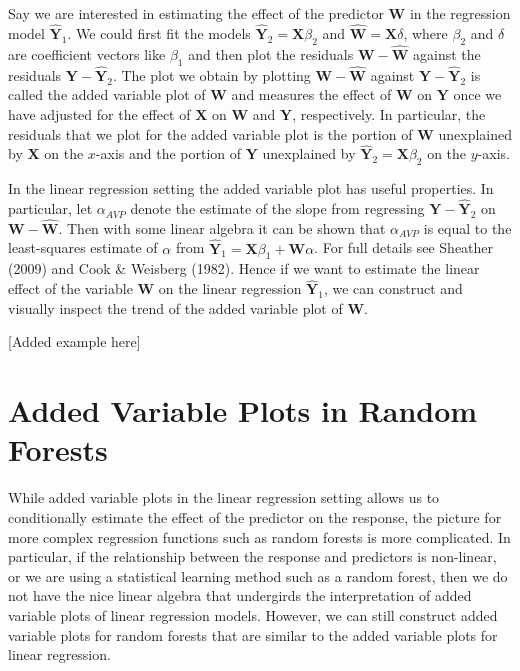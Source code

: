 \documentclass[12pt,twoside]{reedthesis}
\theoremstyle{definition}
\theoremstyle{definition}
\theoremstyle{definition}
\theoremstyle{remark}
\begin{document}
Say we are interested in estimating the effect of the predictor
\(\mathbf{W}\) in the regression model \(\hat{\mathbf{Y}}_1\). We could
first fit the models \(\hat{\mathbf{Y}}_2=\mathbf{X}\beta_2\) and
\(\hat{\mathbf{W}}=\mathbf{X}\delta\), where \(\beta_2\) and \(\delta\)
are coefficient vectors like \(\beta_1\) and then plot the residuals
\(\mathbf{W}-\hat{\mathbf{W}}\) against the residuals
\(\mathbf{Y}-\hat{\mathbf{Y}}_2\). The plot we obtain by plotting
\(\mathbf{W}-\hat{\mathbf{W}}\) against
\(\mathbf{Y}-\hat{\mathbf{Y}}_2\) is called the added variable plot of
\(\mathbf{W}\) and measures the effect of \(\mathbf{W}\) on
\(\mathbf{Y}\) once we have adjusted for the effect of \(\mathbf{X}\) on
\(\mathbf{W}\) and \(\mathbf{Y}\), respectively. In particular, the
residuals that we plot for the added variable plot is the portion of
\(\mathbf{W}\) unexplained by \(\mathbf{X}\) on the \(x\)-axis and the
portion of \(\mathbf{Y}\) unexplained by
\(\hat{\mathbf{Y}}_2=\mathbf{X}\beta_2\) on the \(y\)-axis. \par

In the linear regression setting the added variable plot has useful
properties. In particular, let \(\alpha_{AVP}\) denote the estimate of
the slope from regressing \(\mathbf{Y}-\hat{\mathbf{Y}}_2\) on
\(\mathbf{W}-\hat{\mathbf{W}}\). Then with some linear algebra it can be
shown that \(\alpha_{AVP}\) is equal to the least-squares estimate of
\(\alpha\) from
\(\hat{\mathbf{Y}}_1=\mathbf{X}\beta_1+\mathbf{W}\alpha\). For full
details see Sheather (2009) and Cook \& Weisberg (1982). Hence if we
want to estimate the linear effect of the variable \(\mathbf{W}\) on the
linear regression \(\hat{\mathbf{Y}}_1\), we can construct and visually
inspect the trend of the added variable plot of \(\mathbf{W}\). \par

{[}Added example here{]} \par

\section{Added Variable Plots in Random
Forests}\label{added-variable-plots-in-random-forests}

While added variable plots in the linear regression setting allows us to
conditionally estimate the effect of the predictor on the response, the
picture for more complex regression functions such as random forests is
more complicated. In particular, if the relationship between the
response and predictors is non-linear, or we are using a statistical
learning method such as a random forest, then we do not have the nice
linear algebra that undergirds the interpretation of added variable
plots of linear regression models. However, we can still construct added
variable plots for random forests that are similar to the added variable
plots for linear regression. \par
\end{document}
